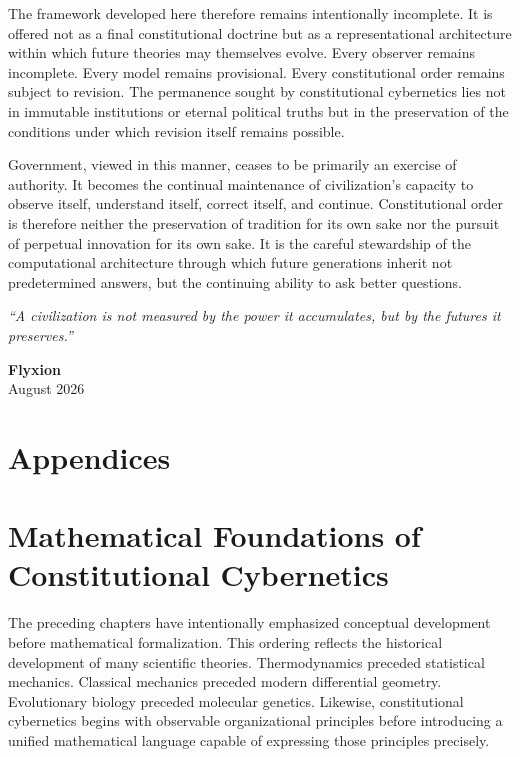 \documentclass[12pt,a4paper]{article}
\begin{document}
The framework developed here therefore remains intentionally incomplete. It is offered not as a final constitutional doctrine but as a representational architecture within which future theories may themselves evolve. Every observer remains incomplete. Every model remains provisional. Every constitutional order remains subject to revision. The permanence sought by constitutional cybernetics lies not in immutable institutions or eternal political truths but in the preservation of the conditions under which revision itself remains possible.

Government, viewed in this manner, ceases to be primarily an exercise of authority. It becomes the continual maintenance of civilization's capacity to observe itself, understand itself, correct itself, and continue. Constitutional order is therefore neither the preservation of tradition for its own sake nor the pursuit of perpetual innovation for its own sake. It is the careful stewardship of the computational architecture through which future generations inherit not predetermined answers, but the continuing ability to ask better questions.

\vspace{2em}

\begin{center}
\emph{``A civilization is not measured by the power it accumulates, but by the futures it preserves.''}
\end{center}

\vspace{1em}

\begin{flushright}
\textbf{Flyxion}\\
August 2026
\end{flushright}


\newpage
\section*{Appendices}

\appendix

\section{Mathematical Foundations of Constitutional Cybernetics}

The preceding chapters have intentionally emphasized conceptual development before mathematical formalization. This ordering reflects the historical development of many scientific theories. Thermodynamics preceded statistical mechanics. Classical mechanics preceded modern differential geometry. Evolutionary biology preceded molecular genetics. Likewise, constitutional cybernetics begins with observable organizational principles before introducing a unified mathematical language capable of expressing those principles precisely.
\end{document}
